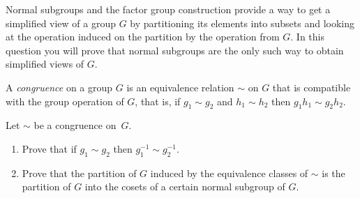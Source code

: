\documentclass[oneside,10pt]{amsart}
\begin{document}
Normal subgroups and the factor group construction provide a way to get a simplified view of a group $G$ by partitioning its elements into subsets and looking at the operation induced on the partition by the operation from $G$. In this question you will prove that normal subgroups are the only such way to obtain simplified views of $G$.

A \emph{congruence} on a group $G$ is an equivalence relation $\sim$ on $G$ that is compatible with the group operation of $G$, that is, if $g_1 \sim g_2$ and $h_1 \sim h_2$ then $g_1h_1 \sim g_2h_2$.

Let $\sim$ be a congruence on~$G$.
\begin{enumerate}[label=(\alph*)]
\item
Prove that if $g_1 \sim g_2$ then $g_1^{-1} \sim g_2^{-1}$.
\item
Prove that the partition of $G$ induced by the equivalence classes of $\sim$ is the partition of $G$ into the cosets of a certain normal subgroup of $G$.
\end{enumerate}
\end{document}
